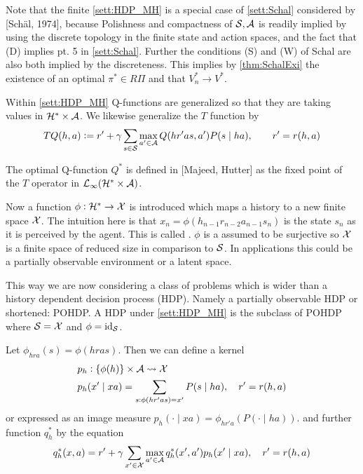 \begin{rem}
  Note that the finite \cref{sett:HDP_MH} is a special case of
  \cref{sett:Schal} considered by [Schäl, 1974],
  because Polishness and compactness of $\mathcal{S}, \mathcal{A}$ is readily
  implied by using the discrete topology in the finite state and action
  spaces, and the fact that (D) implies pt. 5 in \cref{sett:Schal}.
  Further the conditions (S) and (W) of Schal are also both implied by
  the discreteness.
  This implies by \cref{thm:SchalExi} the existence of an optimal
  $\pi^* \in R\Pi$ and that $V^*_n \to V^*$.
\end{rem}

Within \cref{sett:HDP_MH} Q-functions are generalized so that
they are taking values in $\mathcal{H}^* \times \mathcal{A}$.
We likewise generalize the $T$ function by
\[ TQ(h, a) \vcentcolon= r' +
  \gamma \sum_{s\in\mathcal{S}} \max_{a' \in \mathcal{A}} Q(hr'as, a') P(s \mid ha),
\qquad r' = r(h, a)\]

The optimal Q-function $Q^*$ is defined in [Majeed, Hutter] as
the fixed point of the $T$ operator in
$\mathcal{L}_\infty(\mathcal{H}^* \times \mathcal{A})$.

Now a function $\phi : \mathcal{H}^* \to \mathcal{X}$ is introduced
which maps a history to a new finite space $\mathcal{X}$.
The intuition here is that $x_n = \phi(h_{n-1} r_{n-2} a_{n-1} s_n)$ is the
state $s_n$ as it is perceived by the agent.
This is called .
$\phi$ is a assumed to be surjective so $\mathcal{X}$ is a finite space of
reduced size in comparison to $\mathcal{S}$.
In applications this could be a partially observable environment
or a latent space.

This way we are now considering a class of problems
which is wider than a 
history dependent decision process (HDP).
Namely a partially observable HDP or shortened: POHDP.
A HDP under \cref{sett:HDP_MH} is the subclass of POHDP where
$\mathcal{S} = \mathcal{X}$ and $\phi = \text{id}_\mathcal{S}$.

Let $\phi_{hra}(s) = \phi(hras)$. Then we can define a kernel
\begin{align*} p_h & : \{\phi(h)\} \times \mathcal{A} \leadsto \mathcal{X}
  \\ p_h & (x' \mid xa)
  = \sum_{s:\phi(hr'as)=x'} P(s \mid ha), \quad r'=r(h,a)
\end{align*}
or expressed as an image measure
$p_h(\cdot \mid xa) = \phi_{hr'a}(P(\cdot \mid ha))$.
and further function $q_h^*$ by the equation
\[ q_h^*(x, a) = r' + \gamma \sum_{x' \in \mathcal{X}} 
\max_{a' \in \mathcal{A}} q^*_h(x', a')
p_h(x' \mid xa), \quad r'=r(h,a) \]


